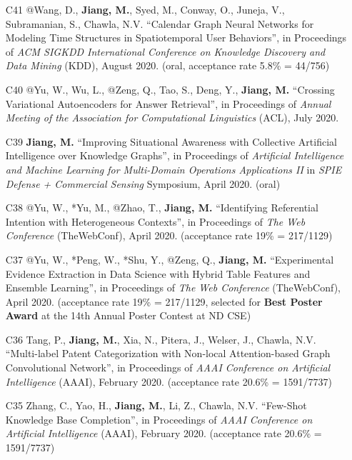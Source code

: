\documentclass[10pt]{article}
\newenvironment{myindentpar}[1]%
{\begin{list}{}%
         {\setlength{\leftmargin}{#1}}%
         \item[]%
}
{\end{list}}
\newcounter{list}
\begin{document}
\begin{myindentpar}{0.00cm}
\begin{enumerate}[leftmargin=.5cm]
\item[C41] @Wang, D., \textbf{Jiang, M.}, Syed, M., Conway, O., Juneja, V., Subramanian, S., Chawla, N.V. ``Calendar Graph Neural Networks for Modeling Time Structures in Spatiotemporal User Behaviors'', in Proceedings of \textit{ACM SIGKDD International Conference on Knowledge Discovery and Data Mining} (KDD), August 2020. (oral, acceptance rate 5.8\% = 44/756)

\item[C40] @Yu, W., Wu, L., @Zeng, Q., Tao, S., Deng, Y., \textbf{Jiang, M.} ``Crossing Variational Autoencoders for Answer Retrieval'', in Proceedings of \textit{Annual Meeting of the Association for Computational Linguistics} (ACL), July 2020.

\item[C39] \textbf{Jiang, M.} ``Improving Situational Awareness with Collective Artificial Intelligence over Knowledge Graphs'', in Proceedings of \textit{Artificial Intelligence and Machine Learning for Multi-Domain Operations Applications II} in \textit{SPIE Defense + Commercial Sensing} Symposium, April 2020. (oral)

\item[C38] @Yu, W., *Yu, M., @Zhao, T., \textbf{Jiang, M.} ``Identifying Referential Intention with Heterogeneous Contexts'', in Proceedings of \textit{The Web Conference} (TheWebConf), April 2020. (acceptance rate 19\% = 217/1129)

\item[C37] @Yu, W., *Peng, W., *Shu, Y., @Zeng, Q., \textbf{Jiang, M.} ``Experimental Evidence Extraction in Data Science with Hybrid Table Features and Ensemble Learning'', in Proceedings of \textit{The Web Conference} (TheWebConf), April 2020. (acceptance rate 19\% = 217/1129, selected for \textbf{Best Poster Award} at the 14th Annual Poster Contest at ND CSE)

\item[C36] Tang, P., \textbf{Jiang, M.}, Xia, N., Pitera, J., Welser, J., Chawla, N.V. ``Multi-label Patent Categorization with Non-local Attention-based Graph Convolutional Network'', in Proceedings of \textit{AAAI Conference on Artificial Intelligence} (AAAI), February 2020. (acceptance rate 20.6\% = 1591/7737)
	
\item[C35] Zhang, C., Yao, H., \textbf{Jiang, M.}, Li, Z., Chawla, N.V. ``Few-Shot Knowledge Base Completion'', in Proceedings of \textit{AAAI Conference on Artificial Intelligence} (AAAI), February 2020. (acceptance rate 20.6\% = 1591/7737)


\end{enumerate}
\end{myindentpar}
\end{document}
